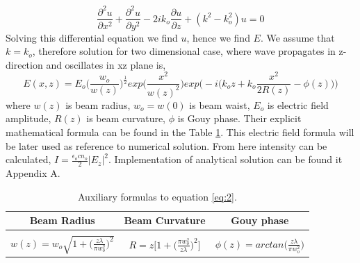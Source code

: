 \documentclass[a4paper]{article}
\begin{document}
	\begin{equation}\label{eq:1}
	\frac{\partial^2 u}{\partial x^2}+ \frac{\partial^2 u}{\partial y^2} - 2ik_o\frac{\partial u}{\partial z}+(k^2-k_o^2)u=0
	\end{equation}
	Solving this differential equation we find $u$, hence we find $E$. We assume that $k = k_o$, therefore solution for two dimensional case, where wave propagates in z-direction and oscillates in xz plane is,
	\begin{equation}\label{eq:2}
	E(x,z)=E_o\bigg(\frac{w_o}{w(z)}\bigg)^{\frac{1}{2}}exp\bigg(\frac{x^2}{w(z)^2}\bigg)exp\bigg(-i\Big(k_oz+k_o\frac{x^2}{2R(z)}-\phi(z)\Big)\bigg)
	\end{equation}
	where $w(z)$ is beam radius, $w_o = w(0)$ is beam waist, $E_o$ is electric field amplitude, $R(z)$ is beam curvature, $\phi$ is Gouy phase. Their explicit mathematical formula can be found in the Table \ref{tab:Table1}. This electric field formula will be later used as reference to numerical solution. From here intensity can be calculated, $I = \frac{\epsilon _o c n_o}{2}|E_z|^2$. Implementation of analytical solution can be found it Appendix A. 
	

	\begin{table}[h!]
		\begin{center}
			\begin{tabular}{c| c| c} %
				\textbf{Beam Radius} & \textbf{Beam Curvature} & \textbf{Gouy phase}\\
				\hline
				&&\\
				$w(z)= w_o\sqrt{1+\Big(\frac{z\lambda}{\pi w_o^2}\Big)^2}$ & $R=z\bigg[1+\Big(\frac{\pi w_o^2}{z\lambda}\Big)^2\bigg]$ & $\phi(z)=arctan\Big(\frac{z\lambda}{\pi w_o^2}\Big)$\\
			\end{tabular}
			\caption{\label{tab:Table1} Auxiliary formulas to equation \ref{eq:2}.}
		\end{center}
	\end{table}
	
\end{document}
